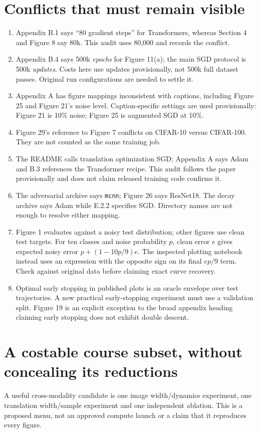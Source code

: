 \documentclass{article}
\begin{document}
\section{Conflicts that must remain visible}
\begin{enumerate}[leftmargin=1.5em,itemsep=3pt]
\item Appendix B.1 says ``80 gradient steps'' for Transformers, whereas
Section 4 and Figure 8 say 80k. This audit uses 80,000 and records the conflict.
\item Appendix B.4 says 500k \emph{epochs} for Figure 11(a); the main SGD
protocol is 500k \emph{updates}. Costs here use updates provisionally, not
500k full dataset passes. Original run configurations are needed to settle it.
\item Appendix A has figure mappings inconsistent with captions, including
Figure 25 and Figure 21's noise level. Caption-specific settings are used
provisionally: Figure 21 is 10\% noise; Figure 25 is augmented SGD at 10\%.
\item Figure 29's reference to Figure 7 conflicts on CIFAR-10 versus
CIFAR-100. They are not counted as the same training job.
\item The README calls translation optimization SGD; Appendix A says Adam
and B.3 references the Transformer recipe. This audit follows the paper
provisionally and does not claim released training code confirms it.
\item The adversarial archive says \texttt{mcnn}; Figure 26 says ResNet18.
The decay archive says Adam while E.2.2 specifies SGD. Directory names are
not enough to resolve either mapping.
\item Figure 1 evaluates against a noisy test distribution; other figures
use clean test targets. For ten classes and noise probability $p$, clean
error $e$ gives expected noisy error $p+(1-10p/9)e$. The inspected plotting
notebook instead uses an expression with the opposite sign on its final
$ep/9$ term. Check against original data before claiming exact curve recovery.
\item Optimal early stopping in published plots is an oracle envelope over
test trajectories. A new practical early-stopping experiment must use a
validation split. Figure 19 is an explicit exception to the broad appendix
heading claiming early stopping does not exhibit double descent.
\end{enumerate}

\section{A costable course subset, without concealing its reductions}
A useful cross-modality candidate is one image width/dynamics experiment,
one translation width/sample experiment and one independent ablation. This
is a proposed menu, not an approved compute launch or a claim that it
reproduces every figure.
\end{document}
